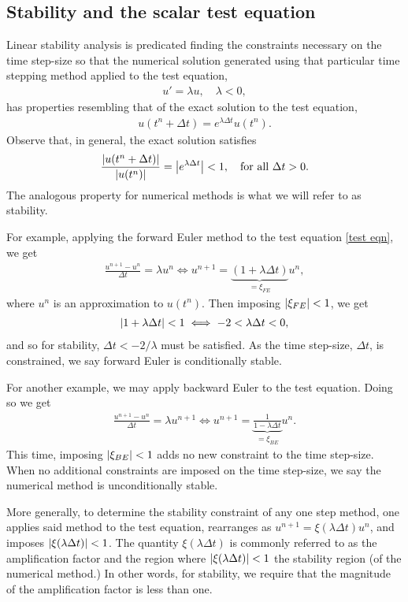 \subsection{Stability and the scalar test equation}
Linear stability analysis is predicated finding the constraints necessary on the time step-size so that the numerical solution generated using that particular time stepping method applied to the test equation, 
\begin{align}
u' = \lambda u, 
\quad \lambda < 0,
\label{test eqn}
\end{align}  
has properties resembling that of the exact solution to the test equation,
\begin{align}
u(t^n + \Delta t) = e^{\lambda \Delta t} u(t^n).
\end{align}
Observe that, in general, the exact solution satisfies
\begin{align}
\frac{\left|u(t^n + \Delta t)\right|}{\left|u(t^n)\right|}
= \left|e^{\lambda\Delta t} \right| 
< 1,
\quad\text{for all } \Delta t > 0.
\end{align}
The analogous property for numerical methods is what we will refer to as stability.

For example, applying the forward Euler method to the test equation \cref{test eqn}, we get 
\begin{align}
\frac{u^{n+1} - u^n}{\Delta t} = \lambda u^n 
\iff u^{n+1} = \underbrace{(1 + \lambda \Delta t)}_{=\xi_{FE}} u^n, 
\end{align}
where $u^n$ is an approximation to $u(t^n)$. Then imposing $\left|\xi_{FE}\right| < 1$, we get 
\begin{align}
\left|1+ \lambda\Delta t\right| < 1 
\iff -2 < \lambda\Delta t < 0,
\end{align}
and so for stability, $\Delta t < -2/\lambda$ must be satisfied. As the time step-size, $\Delta t$, is constrained, we say forward Euler is conditionally stable. 

For another example, we may apply backward Euler to the test equation. Doing so we get 
\begin{align}
\frac{u^{n+1} - u^n}{\Delta t} = \lambda u^{n+1} 
\iff 
u^{n+1} = \underbrace{\frac{1}{1 - \lambda\Delta t}}_{=\xi_{BE}} u^n.
\end{align}
This time, imposing $\left|\xi_{BE}\right|<1$ adds no new constraint to the time step-size. When no additional constraints are imposed on the time step-size, we say the numerical method is unconditionally stable.

More generally, to determine the stability constraint of any one step method, one applies said method to the test equation, rearranges as $u^{n+1} = \xi(\lambda\Delta t) u^n$, and imposes $\left|\xi(\lambda\Delta t)\right| < 1$. The quantity $\xi(\lambda\Delta t)$ is commonly referred to as the amplification factor and the region where $\left|\xi(\lambda\Delta t)\right| < 1$ the stability region (of the numerical method.) In other words, for stability, we require that the magnitude of the amplification factor is less than one.
 
